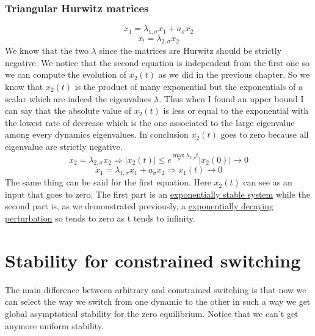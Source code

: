 \subsubsection{Triangular Hurwitz matrices}
	\[
	\dot{x}_1=\lambda_{1,\sigma}x_1+a_{\sigma}x_2\]
	\[
	\dot{x}_!=\lambda_{2,\sigma}x_2
	\]
We know that the two $\lambda$ since the matrices are Hurwitz should be strictly negative. We notice that the second equation is independent from the first one so we can compute the evolution of $x_2(t)$ as we did in the previous chapter. So we know that $x_2(t)$ is the product of many exponential but the exponentials of a scalar which are indeed the eigenvalues $\lambda$. Thus when I found an upper bound I can say that the absolute value of $x_2(t)$ is less or equal to the exponential with the lowest rate of decrease which is the one associated to the large eigenvalue among every dynamics eigenvalues. In conclusion $x_2(t)$ goes to zero because all eigenvalue are strictly negative.
\[
\dot{x}_2=\lambda_{2,\sigma}x_2 \Rightarrow \left|x_2(t)\right|\le e^{\max_p\lambda_{2,p}t}\left |x_2(0)\right| \to 0
\]
\[
\boxed{\dot{x}_1=\lambda_{1,\sigma}x_1}+\boxed{a_{\sigma}x_2}\Rightarrow x_1(t)\to 0
\]
The same thing can be said for the first equation. Here $x_2(t)$ can see as an input that goes to zero. The first part is an \underline{exponentially stable system} while the second part is, as we demonstrated previously, a \underline{exponentially decaying perturbation} so tends to zero as t tends to infinity.

\section{Stability for constrained switching}
The main difference between arbitrary and constrained switching is that now we can select the way we switch from one dynamic to the other  in such a way we get global asymptotical stability for the zero equilibrium. Notice that we can't get anymore uniform stability.

